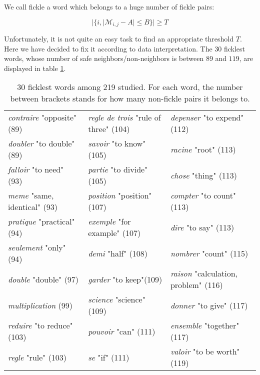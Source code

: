 \documentclass{elsarticle}
\begin{document}
We call fickle a word which belongs to a huge number of fickle pairs:

$$|\{i,|\mathcal{M}_{i,j}-A| \leq B \}| \geq T$$

Unfortunately, it is not quite an easy task to find an appropriate threshold $T$. Here we have decided to fix it according to data interpretation. The $30$ ficklest words, whose number of safe neighbors/non-neighbors is between $89$ and $119$, are displayed in table \ref{tab:ficklest}.

\begin{center}
\begin{table}
\begin{small}
\begin{tabular}{|lll|}
\hline
\textit{contraire} "opposite" (89) & \textit{regle de trois} "rule of three" (104) & \textit{depenser} "to expend" (112) \\
\textit{doubler} "to double" (89) & \textit{savoir}  "to know" (105) & \textit{racine} "root" (113) \\
\textit{falloir} "to need" (93) & \textit{partie} "to divide" (105) & \textit{chose} "thing" (113) \\
\textit{meme} "same, identical" (93) &  \textit{position} "position" (107) & \textit{compter} "to count" (113) \\
\textit{pratique} "practical" (94) &  \textit{exemple} "for example" (107) & \textit{dire} "to say" (113) \\
\textit{seulement}  "only" (94) &  \textit{demi} "half"  (108) & \textit{nombrer} "count" (115) \\
\textit{double} "double" (97) &  \textit{garder} "to keep"(109) & \textit{raison} "calculation, problem" (116) \\
\textit{multiplication} (99) &  \textit{science} "science" (109) & \textit{donner} "to give" (117) \\
\textit{reduire} "to reduce" (103) & \textit{pouvoir} "can" (111) & \textit{ensemble} "together" (117) \\
\textit{regle} "rule" (103) & \textit{se} "if" (111) & \textit{valoir} "to be worth" (119)\\
\hline
\end{tabular}

\end{small}
\caption{30 ficklest words among 219 studied. For each word, the number between brackets stands for how many non-fickle pairs it belongs to.}
\label{tab:ficklest}
\end{table}
\end{center}
\end{document}

